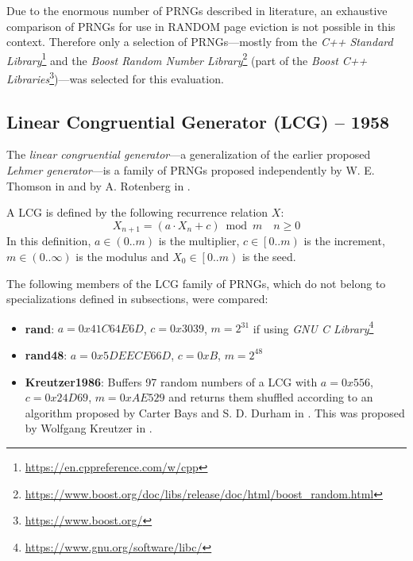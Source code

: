     Due to the enormous number of PRNGs described in literature, an exhaustive comparison of PRNGs for use in RANDOM page eviction is not possible in this context. Therefore only a selection of PRNGs---mostly from the \textit{C++ Standard Library}\footnote{\url{https://en.cppreference.com/w/cpp}} and the \textit{Boost Random Number Library}\footnote{\url{https://www.boost.org/doc/libs/release/doc/html/boost_random.html}} (part of the \textit{Boost C++ Libraries}\footnote{\url{https://www.boost.org/}})---was selected for this evaluation.

\subsection[Linear Congruential Generator (LCG) -- 1958]{Linear Congruential Generator (LCG) -- 1958} \label{subsec:lcg}

    The \emph{linear congruential generator}---a generalization of the earlier proposed \emph{Lehmer generator}---is a family of PRNGs proposed independently by W. E. Thomson in \cite{Thomson:1958} and by A. Rotenberg in \cite{Rotenberg:1960}.

    A LCG is defined by the following recurrence relation $X$:
    \begin{equation*}
        X_{n + 1} = \left(a \cdot X_n + c\right) \bmod m \quad n \geq 0
    \end{equation*}
    In this definition, $a \in \left(0.. m\right)$ is the multiplier, $c \in \left[0.. m\right)$ is the increment, $m \in \left(0.. \infty\right)$ is the modulus and $X_0 \in \left[0.. m\right)$ is the seed.

    The following members of the LCG family of PRNGs, which do not belong to specializations defined in subsections, were compared:
    \begin{itemize}
		\itemsep0em
        \item \textbf{rand}: $a = 0x41C64E6D$, $c = 0x3039$, $m = 2^{31}$ if using \textit{GNU C Library}\footnote{\url{https://www.gnu.org/software/libc/}}
        \item \textbf{rand48}: $a = 0x5DEECE66D$, $c = 0xB$, $m = 2^{48}$
        \item \textbf{Kreutzer1986}: Buffers 97 random numbers of a LCG with $a = 0x556$, $c = 0x24D69$, $m = 0xAE529$ and returns them shuffled according to an algorithm proposed by Carter Bays and S. D. Durham in \cite{Bays:1976}. This was proposed by Wolfgang Kreutzer in \cite{Kreutzer:1986}.
    \end{itemize}

